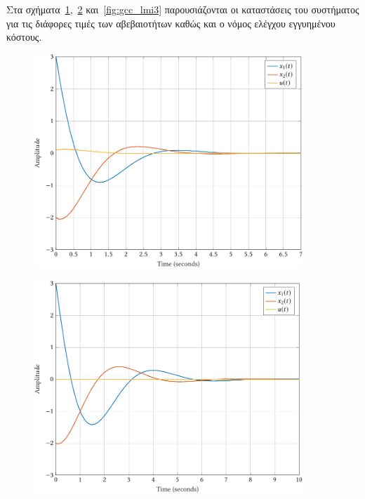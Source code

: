 Στα σχήματα~\ref{fig:gcc_lmi1},~\ref{fig:gcc_lmi2}
και~\ref{fig:gcc_lmi3} παρουσιάζονται οι καταστάσεις του συστήματος για
τις διάφορες τιμές των αβεβαιοτήτων καθώς και ο νόμος ελέγχου εγγυημένου
κόστους.
\begin{figure}[h]
    \centering
    \includegraphics[width=0.9\textwidth]{figures/gcc_lmi1.pdf}
    \label{fig:gcc_lmi1}
\end{figure}
\begin{figure}[h]
    \centering
    \includegraphics[width=0.9\textwidth]{figures/gcc_lmi2.pdf}
    \label{fig:gcc_lmi2}
\end{figure}
